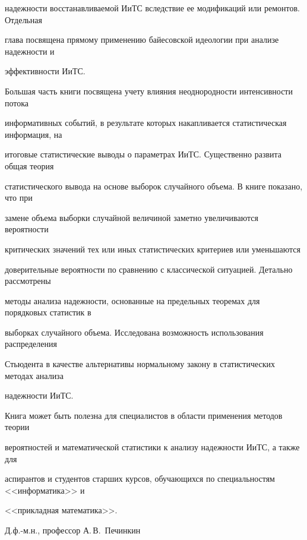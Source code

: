 надежности восстанавливаемой ИиТС вследствие ее модификаций или ремонтов. Отдельная 


глава посвящена прямому применению байесовской идеологии при анализе надежности и 


эффективности ИиТС. 


     


     Большая часть книги посвящена учету влияния неоднородности интенсивности потока 


информативных событий, в результате которых накапливается статистическая информация, на 


итоговые статистические выводы о параметрах ИиТС. Существенно развита  общая теория 


статистического вывода на основе выборок случайного объема. В книге показано, что при 


замене объема выборки случайной величиной заметно увеличиваются вероятности 


критических значений тех или иных статистических критериев или уменьшаются 


доверительные вероятности по сравнению с классической ситуацией. Детально рассмотрены 


методы анализа надежности, основанные на предельных теоремах для порядковых статистик в 


выборках случайного объема. Исследована возможность использования распределения 


Стьюдента в качестве альтернативы нормальному закону в статистических методах анализа 


надежности ИиТС. 


     


     Книга может быть полезна для специалистов в области применения методов теории 


вероятностей и математической статистики к анализу надежности ИиТС, а также для 


аспирантов и студентов старших курсов, обучающихся по специальностям <<информатика>> и 


<<прикладная математика>>.


     


     


Д.ф.-м.н., профессор							А.\,В.~Печинкин


     


     


